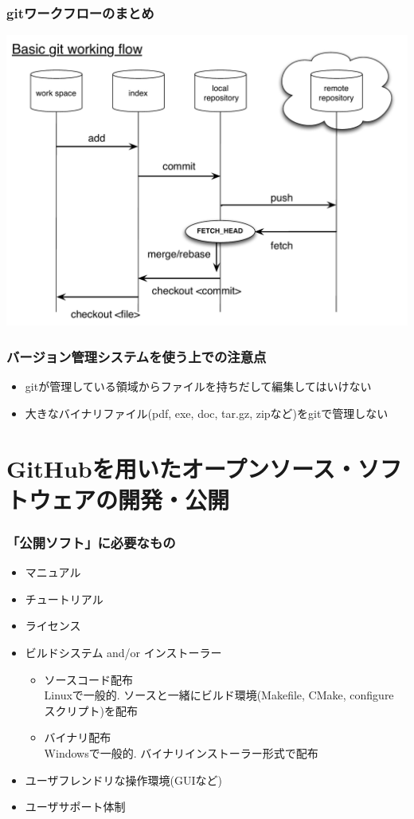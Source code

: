 \begin{frame}
  \frametitle{gitワークフローのまとめ}
  \begin{center}
    \includegraphics[height=.8\textheight]{../workflow/git-diagram.pdf}
  \end{center}
\end{frame}

\begin{frame}
  \frametitle{バージョン管理システムを使う上での注意点}
  \begin{itemize}
    \setlength{\itemsep}{1em}
  \item gitが管理している領域からファイルを持ちだして編集してはいけない
  \item 大きなバイナリファイル(pdf, exe, doc, tar.gz, zipなど)をgitで管理しない
  \end{itemize}
\end{frame}

\section{GitHubを用いたオープンソース・ソフトウェアの開発・公開}

\begin{frame}
  \frametitle{「公開ソフト」に必要なもの}
  \begin{itemize}
  \item マニュアル
  \item チュートリアル
  \item ライセンス
  \item ビルドシステム and/or インストーラー
    \begin{itemize}
    \item ソースコード配布 \\
      Linuxで一般的. ソースと一緒にビルド環境(Makefile, CMake, configure スクリプト)を配布
    \item バイナリ配布 \\
      Windowsで一般的. バイナリインストーラー形式で配布
    \end{itemize}
  \item ユーザフレンドリな操作環境(GUIなど)
  \item ユーザサポート体制
  \end{itemize}
\end{frame}

